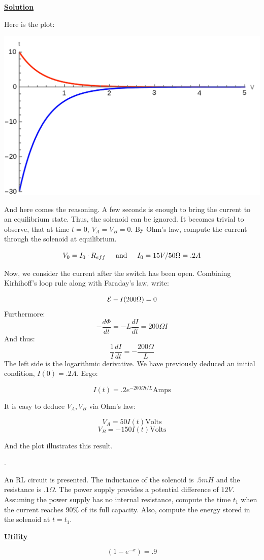 \documentclass{article}
\newcommand{\new}[1]{
    \vspace{2mm}
    \noindent
    \textbf{
    \underline{#1}}
}
\newcounter{problemcnt}
\newcommand{\Problem}{{
    \vspace{5mm}
    \stepcounter{problemcnt}
    \noindent
    \arabic{problemcnt}. 
}
}
\newcommand{\textAnd}{
    {
        \hspace{5mm}
        \textrm{and}
        \hspace{5mm}
    }
}
\begin{document}
\new{Solution}
Here is the plot:
\begin{center}
\includegraphics[width = .5\linewidth]{Q6_plot.png}
\end{center}

And here comes the reasoning. 
A few seconds is enough to bring the current to an 
equilibrium state. Thus, the solenoid can be ignored. 
It becomes trivial to observe, that at time $t = 0$, 
$V_A = V_B = 0$. By Ohm's law, compute the current 
through the solenoid at equilibrium. 

\[
    V_0 = I_0\cdot R_{eff} \textAnd
    I_0 = 15V/50\Omega = .2A
\]

Now, we consider the current after the switch has been open. 
Combining Kirhihoff's loop rule along with Faraday's law, write:

\newcommand{\Ohm}{\Omega}

\[
    \EMF - I(200\Ohm) = 0
\]
Furthermore:
\[
    -\frac{d\Phi}{dt} = -L\frac{dI}{dt} = 200\Ohm I  
\]
And thus:
\[
    \frac{1}{I} \frac{dI}{dt} = -\frac{200\Ohm}{L}
\]
The left side is the logarithmic derivative. We have previously 
deduced an initial condition, $I(0) = .2A$. Ergo:

\[
    I(t) = .2e^{-200\Ohm t/L} \textrm{Amps}
\]

It is easy to deduce $V_A, V_B$ via Ohm's law:

\[
    V_A = 50I(t) \textrm{Volts}
\]
\[
    V_B = -150I(t) \textrm{Volts}
\]

And the plot illustrates this result. 



\newpage

\Problem
An RL circuit is presented. 
The inductance of the solenoid is 
$.5mH$ and the resistance is $.1\Omega$. 
The power supply provides a potential difference of $12V$. 
Assuming the power supply has no internal resistance, compute the 
time $t_1$ when the current reaches $90\%$ of its full capacity. 
Also, compute the energy stored in the solenoid at $t = t_1$. 

\new{Utility} 
\[
    (1-e^{-x}) = .9
\]
\end{document}
